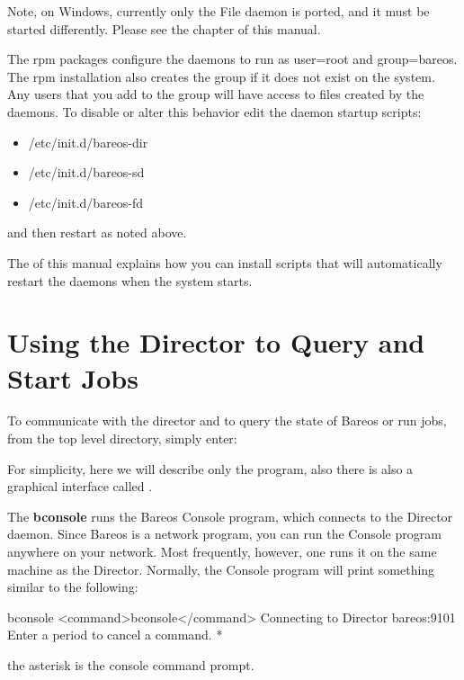 Note, on Windows, currently only the File daemon is ported, and it must be
started differently. Please see the
 chapter of this
manual.

The rpm packages configure the daemons to run as user=root and group=bareos.
The rpm installation also creates the group  if it does not exist on the
system. Any users that you add to the group  will have access to files
created by the daemons. To disable or alter this behavior edit the daemon
startup scripts:

\begin{itemize}
\item /etc/init.d/bareos-dir
\item /etc/init.d/bareos-sd
\item /etc/init.d/bareos-fd
\end{itemize}

and then restart as noted above.

The
 of this manual
explains how you can install scripts that will automatically restart the
daemons when the system starts.

\section{Using the Director to Query and Start Jobs}

To communicate with the director and to query the state of Bareos or run jobs,
from the top level directory, simply enter:


For simplicity, here we will describe only the  program,
also there is also a graphical interface called .

The {\bf bconsole} runs the Bareos Console program, which connects to the
Director daemon. Since Bareos is a network program, you can run the Console
program anywhere on your network. Most frequently, however, one runs it on the
same machine as the Director. Normally, the Console program will print
something similar to the following:

\begin{commands}{bconsole}
<command>bconsole</command>
Connecting to Director bareos:9101
Enter a period to cancel a command.
*
\end{commands}

the asterisk is the console command prompt.

